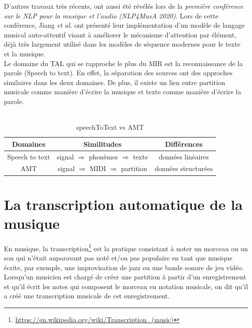 D’autres travaux très récents, ont aussi été révélés lors de la
\textit{première conférence sur le NLP pour la musique et l'audio
(NLP4MusA 2020)}. Lors de cette conférence, Jiang \textit{et al.}
\cite{Jiang2020DiscoveringMR} ont présenté leur implémentation d’un modèle de
langage musical auto-attentif visant à améliorer le mécanisme d'attention par
élément, déjà très largement utilisé dans les modèles de séquence modernes pour
le texte et la musique.\\
Le domaine du TAL qui se rapproche le plus du MIR est la reconnaissance de la
parole (Speech to text). En effet, la séparation des sources ont des approches similaires dans
les deux domaines. De plus, il existe un lien entre partition musicale comme
manière d’écrire la musique et texte comme manière d’écrire la parole.\\\\
\begin{table}[h]
	\centering
	\begin{tabular}{|c|c|c|} \hline
		Domaines & Similitudes & Différences \\ \hline
		Speech to text & signal $\Rightarrow$ phonèmes $\Rightarrow$ texte & données linéaires\\
		AMT & signal $\Rightarrow$ MIDI $\Rightarrow$ partition & données structurées\\ \hline
	\end{tabular}
	\caption{speechToText vs AMT}
	\label{spToTxt_vs_AMT}
\end{table}


\section{La transcription automatique de la musique}
En musique, la transcription\footnote{\url{
https://en.wikipedia.org/wiki/Transcription_(music)}} 
est la pratique
consistant à noter un morceau ou un son qui n'était auparavant pas noté et/ou
pas populaire en tant que musique écrite, par exemple, une improvisation de
jazz ou une bande sonore de jeu vidéo. Lorsqu'un musicien est chargé de créer
une partition à partir d'un enregistrement et qu'il écrit les notes qui
composent le morceau en notation musicale, on dit qu'il a créé une
transcription musicale de cet enregistrement.

